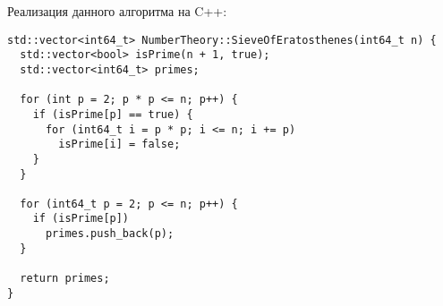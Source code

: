 \documentclass[12pt, a4paper, openany]{book}
\begin{document}
\newpage
\noindent
Реализация данного алгоритма на C++:

\begin{lstlisting}[breaklines=true]
std::vector<int64_t> NumberTheory::SieveOfEratosthenes(int64_t n) {
  std::vector<bool> isPrime(n + 1, true);
  std::vector<int64_t> primes;

  for (int p = 2; p * p <= n; p++) {
    if (isPrime[p] == true) {
      for (int64_t i = p * p; i <= n; i += p)
        isPrime[i] = false;
    }
  }

  for (int64_t p = 2; p <= n; p++) {
    if (isPrime[p])
      primes.push_back(p);
  }

  return primes;
}
\end{lstlisting}
\end{document}
